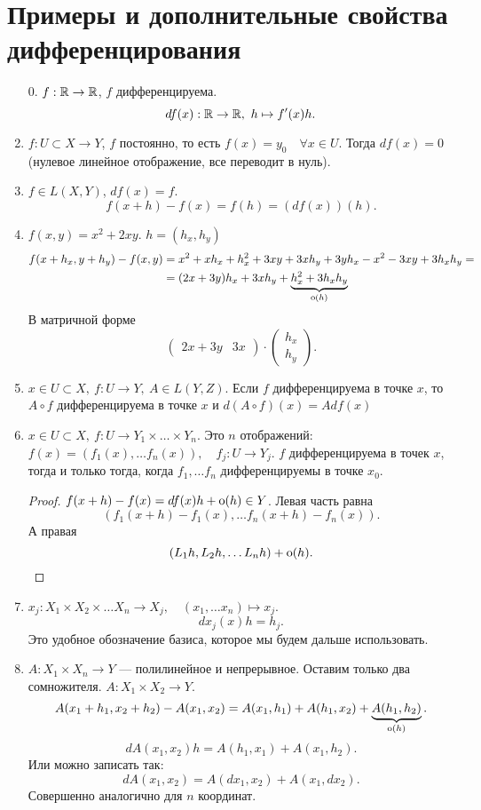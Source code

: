 \section{Примеры и дополнительные свойства дифференцирования}
\begin{enumerate}
    \item[0.] $ f: \mathbb{R} \to  \mathbb{R}$, $ f$ дифференцируема.
	\[
	    df(x): \mathbb{R} \to  \mathbb{R}, ~ h \mapsto f'(x) h
	.\] 
    \item $ f: U \subset X\to  Y$, $ f$ постоянно, то есть $ f(x) = y_0 \quad \forall  x \in U$. Тогда
	$ df(x) = 0$  (нулевое линейное отображение, все переводит в нуль).
    \item $ f \in L(X, Y)$, $ df(x) = f$.
	 \[
	     f(x+h) - f(x) = f(h) = (df(x))(h)
	.\] 
    \item $ f(x, y) = x^2+ 2xy$. $ h = (h_x, h_y)$
 \begin{align*}
     f(x+h_x, y+h_y) - f(x, y) &= x^2 + xh_x + h^2_x + 3xy + 3xh_y + 3 yh_x - x^2 - 3xy  + 3 h_x h_y= \\
			       &= (2x+3y) h_x + 3xh_y + \underbrace{h_x^2+ 3h_x h_y}_{{\mathop{\text{\rm o}}}(h)} 
\end{align*}
В матричной форме
\[
    \begin{pmatrix}
	2x + 3y & 3x
    \end{pmatrix} \cdot 
    \begin{pmatrix}
        h_x \\ h_y
    \end{pmatrix}
.\] 
\item $ x \in U \subset X, ~ f: U \to  Y, ~ A \in L(Y, Z)$. Если $ f$ дифференцируема в точке $ x$, то $ A \circ f$ дифференцируема в точке $ x$ и $ d(A \circ f) (x) = A df(x)$
\item $ x \in U \subset X, ~ f: U \to  Y_1 \times \ldots \times Y_n$. Это $ n$ отображений: $ f(x) = \left( f_1(x), \ldots f_n(x)  \right) , \quad f_j: U \to  Y_j$. 
    $ f$ дифференцируема в точек $ x$, тогда и только тогда, когда $ f_1, \ldots f_n$ дифференцируемы в точке $x_0$.
    \begin{proof}
	    $ f(x + h) - f(x) = df(x) h + {\mathop{\text{\rm o}}}(h) \in  Y$. Левая часть равна
		\[
		    \left( f_1(x+h) - f_1(x), \ldots f_n(x+h)-f_n(x) \right) 
		.\] 
		А правая
		\[
		    (L_1h, L_2h, \ldots L_nh) + {\mathop{\text{\rm o}}}(h)
		.\] 
		
    \end{proof}
\item $x_j: X_1 \times X_2 \times  \ldots X_n \to X_j, \quad (x_1, \ldots x_n) \mapsto x_j$.
    \[
	dx_j(x)h = h_j
    .\] 
    Это удобное обозначение базиса, которое мы будем дальше использовать.
\item $ A : X_1 \times X_n \to  Y$ --- полилинейное и непрерывное.
    Оставим только два сомножителя.
    $ A: X_1 \times X_2 \to  Y$. 
    \[
	A(x_1 + h_1, x_2 + h_2) - A(x_1, x_2) = A(x_1, h_1) + A(h_1, x_2) + \underbrace{A(h_1, h_2)}_{{\mathop{\text{\rm o}}}(h)}
    .\] 
    \[
	dA(x_1, x_2) h = A(h_1, x_1) + A(x_1, h_2)
    .\] 
    Или можно записать так:
    \[
	dA(x_1, x_2) = A(dx_1, x_2) + A(x_1, dx_2)
    .\] 
    Совершенно аналогично для $ n$ координат.
\end{enumerate}
